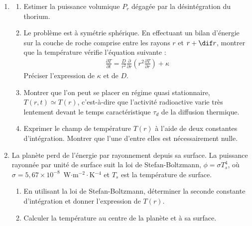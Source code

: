 \begin{enumerate}

\item

\begin{enumerate}

	\item Estimer la puissance volumique $P_r$ dégagée par la désintégration du thorium.

	\item Le problème est à symétrie sphérique. En effectuant un bilan d'énergie sur la couche de roche comprise entre les rayons $r$ et $r+\dif r$, montrer que la température vérifie l'équation suivante :
	\begin{align*}
		\frac{\partial T}{\partial t}=\frac{D}{r^2}\frac{\partial }{\partial r}\left( r^2\frac{\partial T}{\partial r}\right)  + \kappa
	\end{align*}
	Préciser l'expression de $\kappa$ et de $D$.

	\item Montrer que l'on peut se placer en régime quasi stationnaire, $T(r,t)\simeq T(r)$, c'est-à-dire que l'activité radioactive varie très lentement devant le temps caractéristique $\tau_d$ de la diffusion thermique.

	\item Exprimer le champ de température $T(r)$ à l'aide de deux constantes d'intégration. Montrer que l'une d'entre elles est nécessairement nulle.

\end{enumerate}

\item La planète perd de l'énergie par rayonnement depuis sa surface. La puissance rayonnée par unité de surface suit la loi de Stefan-Boltzmann, $\phi=\sigma T_s^4$, où $\sigma=5{,}67\times10^{-8}$~W$\cdot$m$^{-2}\cdot$K$^{-4}$ et $T_s$ est la température de surface.

\begin{enumerate}

	\item En utilisant la loi de Stefan-Boltzmann, déterminer la seconde constante d'intégration et donner l'expression de $T(r)$.

	\item Calculer la température au centre de la planète et à sa surface.

\end{enumerate}

\end{enumerate}

